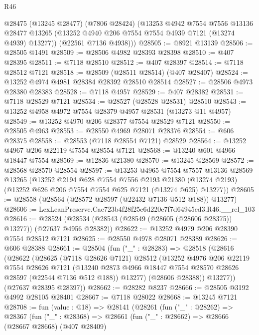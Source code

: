 \begin{lexlean}{R46}
\begin{coremodule}
      @28475
        (@13245 @28477)
        (@7806 @28424)
        (@13253
          @4942
          @7554
          @7556
          @13136
          @28477
          @13265
          (@13252 @4940 @206 @7554 @7554 @4939 @7121 (@13274 @4939) @13277))
        (@22561 @7136 @4938)))
@28505 := @8921 @13139
@28506 := @28505 @1491
@28509 := @28506 @4982 @28393 @28398
@28510 := @407 @28395
@28511 := @7118 @28510
@28512 := @407 @28397
@28514 := @7118 @28512 @7121
@28518 := @28509 (@28511 @28514) (@407 @28407)
@28524 := @13252 @4974 @4981 @28384 @28392 @28510 @28514
@28527 := @28506 @4973 @28380 @28383
@28528 := @7118 @4957
@28529 := @407 @28382
@28531 := @7118 @28529 @7121
@28534 := @28527 (@28528 @28531) @28510
@28543 := @13252 @4958 @4972 @7554 @28379 @4957 @28531 (@13273 @11 @4957)
@28549 := @13252 @4970 @206 @28377 @7554 @28529 @7121
@28550 := @28505 @4963
@28553 := @28550 @4969 @28071 @28376
@28554 := @606 @28375
@28558 := @28553 (@7118 @28554 @7121) @28529
@28564 := @13252 @4967 @206 @22119 @7554 @28554 @7121
@28568 := @13240 @601 @4966 @18447 @7554
@28569 := @12836 @21380
@28570 := @13245 @28569
@28572 := @28568 @28570 @28554
@28597 := @13253
    @4965
    @7554
    @7557
    @13136
    @28569
    @13265
    (@13252
      @2194
      @628
      @7554
      @7556
      @2193
      @21380
      (@13274 @2193)
      (@13252 @626 @206 @7554 @7554 @625 @7121 (@13274 @625) @13277))
@28605 := @28558 (@28564 (@28572 @28597 (@22432 @7136 @512 @188)) @13277)
@28606 := LexLeanPreserve.Cae723b4f28f25c6d220e7f7d64945ed3.R46.__rel_103
@28616 := @28524 (@28534 (@28543 (@28549 (@28605 (@28606 @28375)) @13277)) (@27637 @4956 @28382))
@28622 := @13252 @4979 @206 @28390 @7554 @28512 @7121
@28625 := @28550 @4978 @28071 @28389
@28626 := @606 @28388
@28661 := @28504
    (fun ("_" : @28283) =>
    @28518
      (@28616
        (@28622
          (@28625
            (@7118 @28626 @7121)
            @28512
            (@13252
              @4976
              @206
              @22119
              @7554
              @28626
              @7121
              (@13240 @2873 @4966 @18447 @7554 @28570 @28626 @28597 (@22544 @7136 @512 @188))
              @13277)
            (@28606 @28388))
          @13277))
      (@27637 @28395 @28397))
@28662 := @28282 @8237
@28666 := @28505 @3192 @4992 @28105 @28401
@28667 := @7118 @28022
@28668 := @13245 @7121
@28708 := fun (value : @18) =>
  @28141
    (@28261
      (fun ("_" : @28262) =>
      @28367
        (fun ("_" : @28368) =>
        @28661
          (fun ("_" : @28662) =>
          @28666
            (@28667 @28668)
            (@407 @28409)

\end{coremodule}
\end{lexlean}
